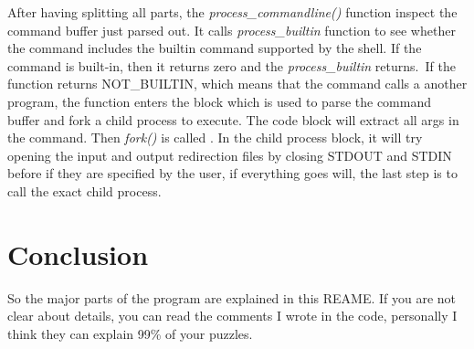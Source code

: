 \documentclass[a4paper,10pt]{article}
\begin{document}
After having splitting all parts, the \textit{process\_commandline()} function inspect the command buffer just parsed out. It calls \textit{process\_builtin}
function to see whether the command includes the builtin command supported by the shell. If the command is built-in, then it returns zero and the \textit{process\_builtin} returns.\
If the function returns NOT\_BUILTIN, which means that the command calls a another program, the function enters the block which is used to parse the 
command buffer and fork a child process to execute. The code block will extract all args in the command. Then \textit{fork()} is called
. In the child process block, it will try opening the input and output redirection files by closing STDOUT and STDIN before if they are specified by the user, if everything
goes will, the last step is to call the exact child process. 

\section{Conclusion}
So the major parts of the program are explained in this REAME. If you are not clear about details, you can read the comments I wrote in the code,
personally I think they can explain 99\% of your puzzles.
\end{document}
